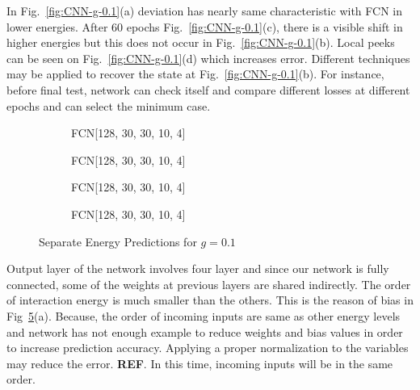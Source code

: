 \documentclass[a4paper,times,12pt]{article}
\begin{document}
In Fig.~\ref{fig:CNN-g-0.1}(a) deviation has nearly same characteristic with FCN in lower energies. After 60 epochs Fig.~\ref{fig:CNN-g-0.1}(c), there is a visible shift in higher energies but this does not occur in Fig.~\ref{fig:CNN-g-0.1}(b). Local peeks can be seen on Fig.~\ref{fig:CNN-g-0.1}(d) which increases error. Different techniques may be applied to recover the state at Fig.~\ref{fig:CNN-g-0.1}(b). For instance, before final test, network can check itself and compare different losses at different epochs and can select the minimum case. 


\begin{figure}[H]
    \centering
    \begin{subfigure}[t]{0.45\textwidth}
		\centering
        
        \caption{FCN[128, 30, 30, 10, 4]}
		\label{fig:a}
    \end{subfigure}
    \begin{subfigure}[t]{0.45\textwidth}
		\centering
        
        \caption{FCN[128, 30, 30, 10, 4]}
		\label{fig:b}
    \end{subfigure}    
    \begin{subfigure}[t]{0.45\textwidth}
        \centering
        
        \caption{FCN[128, 30, 30, 10, 4]}
		\label{fig:c}
    \end{subfigure}
    \begin{subfigure}[t]{0.45\textwidth}
        \centering
        
        \caption{FCN[128, 30, 30, 10, 4]}
		\label{fig:c}
    \end{subfigure}
	\caption{Separate Energy Predictions for $g = 0.1$ }
\label{fig:FFN-g-0.1-S}
\end{figure}


Output layer of the network involves four layer and since our network is fully connected, some of the weights at previous layers are shared indirectly. The order of interaction energy is much smaller than the others. This is the reason of bias in Fig~\ref{fig:FFN-g-0.1-S}(a). Because, the order of incoming inputs are same as other energy levels and network has not enough example to reduce weights and bias values in order to increase prediction accuracy. Applying a proper normalization to the variables may reduce the error. \textbf{REF}. In this time, incoming inputs will be in the same order.
\end{document}
